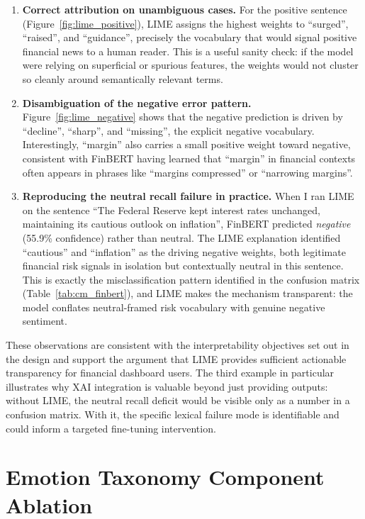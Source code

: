\begin{enumerate}
    \item \textbf{Correct attribution on unambiguous cases.}  For the positive sentence (Figure~\ref{fig:lime_positive}), LIME assigns the highest weights to ``surged'', ``raised'', and ``guidance'', precisely the vocabulary that would signal positive financial news to a human reader.  This is a useful sanity check: if the model were relying on superficial or spurious features, the weights would not cluster so cleanly around semantically relevant terms.

    \item \textbf{Disambiguation of the negative error pattern.}  Figure~\ref{fig:lime_negative} shows that the negative prediction is driven by ``decline'', ``sharp'', and ``missing'', the explicit negative vocabulary.  Interestingly, ``margin'' also carries a small positive weight toward negative, consistent with FinBERT having learned that ``margin'' in financial contexts often appears in phrases like ``margins compressed'' or ``narrowing margins''.

    \item \textbf{Reproducing the neutral recall failure in practice.}  When I ran LIME on the sentence ``The Federal Reserve kept interest rates unchanged, maintaining its cautious outlook on inflation'', FinBERT predicted \textit{negative} (55.9\% confidence) rather than neutral.  The LIME explanation identified ``cautious'' and ``inflation'' as the driving negative weights, both legitimate financial risk signals in isolation but contextually neutral in this sentence.  This is exactly the misclassification pattern identified in the confusion matrix (Table~\ref{tab:cm_finbert}), and LIME makes the mechanism transparent: the model conflates neutral-framed risk vocabulary with genuine negative sentiment.
\end{enumerate}

These observations are consistent with the interpretability objectives set out in the design and support the argument that LIME provides sufficient actionable transparency for financial dashboard users.  The third example in particular illustrates why XAI integration is valuable beyond just providing outputs: without LIME, the neutral recall deficit would be visible only as a number in a confusion matrix.  With it, the specific lexical failure mode is identifiable and could inform a targeted fine-tuning intervention.

\section{Emotion Taxonomy Component Ablation}
\label{sec:emotion_ablation}

